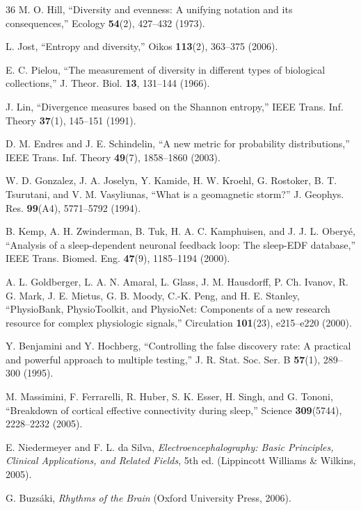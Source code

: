 \documentclass[12pt,a4paper]{article}
\begin{document}
\begin{thebibliography}{36}
 M. O. Hill, ``Diversity and evenness: A unifying notation and its consequences,'' Ecology \textbf{54}(2), 427--432 (1973).

 L. Jost, ``Entropy and diversity,'' Oikos \textbf{113}(2), 363--375 (2006).

 E. C. Pielou, ``The measurement of diversity in different types of biological collections,'' J. Theor. Biol. \textbf{13}, 131--144 (1966).

 J. Lin, ``Divergence measures based on the Shannon entropy,'' IEEE Trans. Inf. Theory \textbf{37}(1), 145--151 (1991).

 D. M. Endres and J. E. Schindelin, ``A new metric for probability distributions,'' IEEE Trans. Inf. Theory \textbf{49}(7), 1858--1860 (2003).

 W. D. Gonzalez, J. A. Joselyn, Y. Kamide, H. W. Kroehl, G. Rostoker, B. T. Tsurutani, and V. M. Vasyliunas, ``What is a geomagnetic storm?'' J. Geophys. Res. \textbf{99}(A4), 5771--5792 (1994).

 B. Kemp, A. H. Zwinderman, B. Tuk, H. A. C. Kamphuisen, and J. J. L. Obery{\'e}, ``Analysis of a sleep-dependent neuronal feedback loop: The sleep-EDF database,'' IEEE Trans. Biomed. Eng. \textbf{47}(9), 1185--1194 (2000).

 A. L. Goldberger, L. A. N. Amaral, L. Glass, J. M. Hausdorff, P. Ch. Ivanov, R. G. Mark, J. E. Mietus, G. B. Moody, C.-K. Peng, and H. E. Stanley, ``PhysioBank, PhysioToolkit, and PhysioNet: Components of a new research resource for complex physiologic signals,'' Circulation \textbf{101}(23), e215--e220 (2000).

 Y. Benjamini and Y. Hochberg, ``Controlling the false discovery rate: A practical and powerful approach to multiple testing,'' J. R. Stat. Soc. Ser. B \textbf{57}(1), 289--300 (1995).

 M. Massimini, F. Ferrarelli, R. Huber, S. K. Esser, H. Singh, and G. Tononi, ``Breakdown of cortical effective connectivity during sleep,'' Science \textbf{309}(5744), 2228--2232 (2005).

 E. Niedermeyer and F. L. da Silva, \emph{Electroencephalography: Basic Principles, Clinical Applications, and Related Fields}, 5th ed. (Lippincott Williams \& Wilkins, 2005).

 G. Buzs{\'a}ki, \emph{Rhythms of the Brain} (Oxford University Press, 2006).


\end{thebibliography}
\end{document}

